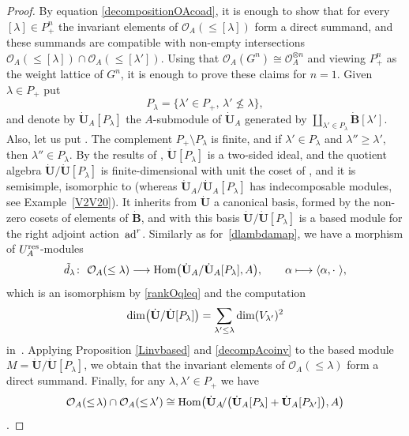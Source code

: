 \documentclass[pdftex]{sigma}
\numberwithin{equation}{section}
\theoremstyle{definition}
\newcommand{\mc}{\mathbb{C}}
\newcommand{\Oo}{{\mathcal O}}
\begin{document}
\begin{proof} By equation \eqref{decompositionOAcoad}, it is enough to show that for every $[\lambda]\in P_+^n$ the invariant elements of $\Oo_A(\leq [\lambda])$ form a direct summand, and these summands are compatible with non-empty intersections $\Oo_A(\leq [\lambda]) \cap \Oo_A(\leq [\lambda'])$. Using that $\Oo_A(G^n) \cong \Oo_A^{\otimes n}$ and viewing $P_+^n$ as the weight lattice of $G^n$, it is enough to prove these claims for $n=1$. Given $\lambda\in P_+$ put
\[P_{\lambda} = \{\lambda'\in P_+, \, \lambda' \nleqslant \lambda\},\]
and denote by $\dot{\mathbf{U}}_A [P_\lambda]$ the $A$-submodule of $\dot{\mathbf{U}}_A$ generated by $\coprod_{\lambda' \in P_\lambda} \dot{\mathbf{B}} [\lambda']$. Also, let us put \smash{$\dot{\mathbf{U}} [P_\lambda]= \dot{\mathbf{U}}_A [P_\lambda]\bigotimes_A \mc(q)$}.
The complement $P_+\setminus P_{\lambda}$ is finite, and if $\lambda'\in P_{\lambda}$ and $\lambda''\geq \lambda'$, then $\lambda''\in P_{\lambda}$. By the results of \cite[Section~29.2]{Lusztig}, $ \dot{\mathbf{U}} [P_\lambda]$ is a two-sided ideal, and the quotient algebra $\dot{\mathbf{U}} / \dot{\mathbf{U}} [P_\lambda]$ is finite-dimensional with unit the coset of , and it is semisimple, isomorphic to  (whereas $\dot{\mathbf{U}}_A / \dot{\mathbf{U}}_A [P_\lambda]$ has indecomposable modules, see Example~\ref{V2V20}).
It inherits from $\dot{\mathbf{U}}$ a canonical basis, formed by the non-zero cosets of elements of $\dot{\mathbf{B}}$, and with this basis $\dot{\mathbf{U}} / \dot{\mathbf{U}} [P_\lambda]$ is a based module for the right adjoint action~${\rm ad}^r$. Similarly as for~\eqref{dlambdamap}, we have a morphism of $U_A^{\rm res}$-modules
\[
\tilde{d}_\lambda\colon\ \Oo_A(\leq \lambda)\longrightarrow {\rm Hom} \big( \dot{\mathbf{U}}_A / \dot{\mathbf{U}}_A [P_\lambda],A\big),\qquad \alpha\longmapsto\langle \alpha , \cdot \ \rangle,\]
which is an isomorphism by \eqref{rankOqleq} and the computation \[ {\rm dim}\bigl(\dot{\mathbf{U}} / \dot{\mathbf{U}} [P_\lambda]\bigr) = \sum_{\lambda'\leq \lambda} {\rm dim}(V_{\lambda'})^2\] in~\cite[Section~29.2]{Lusztig}. Applying Proposition \ref{Linvbased} and \eqref{decompAcoinv} to the based module ${M=\dot{\mathbf{U}} / \dot{\mathbf{U}} [P_\lambda]}$, we obtain that the invariant elements of $\Oo_A(\leq \lambda)$ form a direct summand. Finally, for any ${\lambda,\lambda'\!\in\! P_+}$ we have \[\Oo_A(\leq \! \lambda) \cap \Oo_A(\leq \! \lambda')\cong {\rm Hom} \bigl( \dot{\mathbf{U}}_A \!/\bigl(\dot{\mathbf{U}}_A [P_\lambda]+ \dot{\mathbf{U}}_A [P_{\lambda'}]\bigr),A\bigr)\].

\end{proof}
\end{document}
